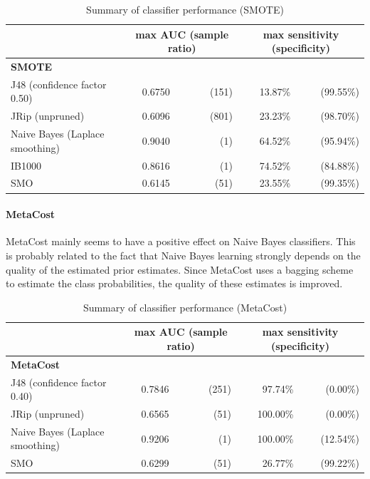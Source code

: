 \begin{table}[h]
\centering  
\begin{tabular}{ l | c r | r r|}                                      
& \multicolumn{2}{c}{max AUC (sample ratio)} & \multicolumn{2}{c}{max sensitivity (specificity)} \\
\hline
\multicolumn{5}{l}{\textbf{SMOTE}}\\
\hline
J48 (confidence factor 0.50) & 0.6750 & (151) & 13.87\% & (99.55\%)\\
JRip (unpruned) & 0.6096 & (801) & 23.23\% & (98.70\%)\\
Naive Bayes (Laplace smoothing) & 0.9040 & (1) & 64.52\% & (95.94\%)\\
IB1000 & 0.8616 & (1) & 74.52\% & (84.88\%)\\
SMO & 0.6145 & (51) & 23.55\% & (99.35\%)\\
\hline
\end{tabular}
\label{table:Performance02}
\caption{Summary of classifier performance (SMOTE)} %
\end{table}

\paragraph{MetaCost} MetaCost mainly seems to have a positive effect on Naive Bayes classifiers. This is probably related to the fact that Naive Bayes learning strongly depends on the quality of the estimated prior estimates. Since MetaCost uses a bagging scheme to estimate the class probabilities, the quality of these estimates is improved. 

\begin{table}[h]
\centering  
\begin{tabular}{ l | c r | r r|}  
& \multicolumn{2}{c}{max AUC (sample ratio)} & \multicolumn{2}{c}{max sensitivity (specificity)} \\
\hline
\multicolumn{5}{l}{\textbf{MetaCost}}\\
\hline
J48 (confidence factor 0.40) & 0.7846 & (251) & 97.74\% & (0.00\%)\\
JRip (unpruned) & 0.6565 & (51) & 100.00\% & (0.00\%)\\
Naive Bayes (Laplace smoothing) & 0.9206 & (1) & 100.00\% & (12.54\%)\\
SMO & 0.6299 & (51) & 26.77\% & (99.22\%)\\
\hline
\end{tabular}
\label{table:Performance02}
\caption{Summary of classifier performance (MetaCost)} %
\end{table}

